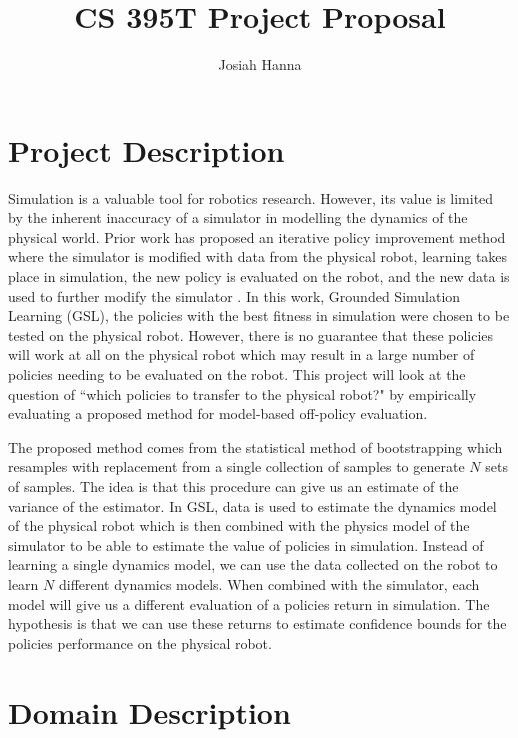 \documentclass[11 pt]{article}
\author{Josiah Hanna}
\title{CS 395T Project Proposal}
\begin{document}

\section{Project Description}

Simulation is a valuable tool for robotics research. However, its value is limited by the inherent inaccuracy of a simulator in modelling the dynamics of the physical world. Prior work has proposed an iterative policy improvement method where the simulator is modified with data from the physical robot, learning takes place in simulation, the new policy is evaluated on the robot, and the new data is used to further modify the simulator \cite{farchy2013humanoid}. In this work, Grounded Simulation Learning (GSL), the policies with the best fitness in simulation were chosen to be tested on the physical robot. However, there is no guarantee that these policies will work at all on the physical robot which may result in a large number of policies needing to be evaluated on the robot. This project will look at the question of ``which policies to transfer to the physical robot?" by empirically evaluating a proposed method for model-based off-policy evaluation.

The proposed method comes from the statistical method of bootstrapping which resamples with replacement from a single collection of samples to generate $N$ sets of samples. The idea is that this procedure can give us an estimate of the variance of the estimator. In GSL, data is used to estimate the dynamics model of the physical robot which is then combined with the physics model of the simulator to be able to estimate the value of policies in simulation. Instead of learning a single dynamics model, we can use the data collected on the robot to learn $N$ different dynamics models. When combined with the simulator, each model will give us a different evaluation of a policies return in simulation. The hypothesis is that we can use these returns to estimate confidence bounds for the policies performance on the physical robot.


\section{Domain Description}
\end{document}
